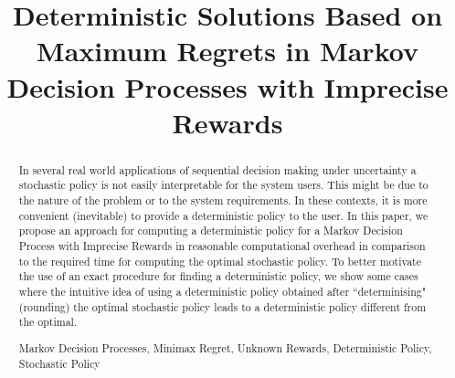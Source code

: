 \documentclass[runningheads,a4paper]{llncs}
\newcommand{\up}[1]{\textsuperscript{#1}}
\newcommand{\keywords}[1]{\par\addvspace\baselineskip
\noindent\keywordname\enspace\ignorespaces#1}
\begin{document}
\mainmatter  %

\title{Deterministic Solutions Based on Maximum Regrets in Markov Decision Processes with Imprecise Rewards}


%
%


%



%
%

\maketitle


\begin{abstract}
In several real world applications of sequential decision making under uncertainty a stochastic policy is not easily interpretable for the system users. This might be due to the nature of the problem or to the system requirements. In these contexts, it is more convenient (inevitable) to provide a deterministic policy to the user. In this paper, we propose an approach for computing a deterministic policy for a Markov Decision Process with Imprecise Rewards in reasonable computational overhead in comparison to the required time for computing the optimal stochastic policy. To better motivate the use of an exact procedure for finding a deterministic policy, we show some cases where the intuitive idea of using a deterministic policy obtained after ``determinising" (rounding) the optimal stochastic policy leads to a deterministic policy different from the optimal.

\keywords{Markov Decision Processes, Minimax Regret, Unknown Rewards, Deterministic Policy, Stochastic Policy}
\end{abstract}
\end{document}

